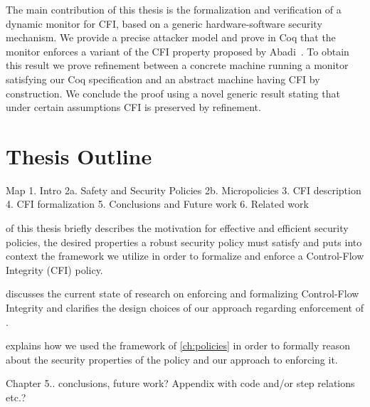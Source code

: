 The main contribution of this thesis is the formalization and
verification of a dynamic monitor for CFI, based on a generic
hardware-software security mechanism.
%
We provide a precise attacker model and prove in Coq that the monitor
enforces a variant of the CFI property proposed by
Abadi~\ETAL\cite{AbadiBEL09}.
%
To obtain this result we prove refinement between a concrete
machine running a monitor satisfying our Coq specification
and an abstract machine having CFI by construction.
%
We conclude the proof using a novel generic result stating that under
certain assumptions CFI is preserved by refinement.

\section{Thesis Outline}\label{sec:outline}
Map
1. Intro
2a. Safety and Security Policies
2b. Micropolicies
3. CFI description
4. CFI formalization
5. Conclusions and Future work
6. Related work

 of this thesis briefly describes the motivation for
effective and efficient security policies, the desired properties a
robust security policy must satisfy and puts into context the
framework we utilize in order to formalize and enforce a Control-Flow
Integrity (CFI) policy.  

 discusses the current state of
research on enforcing and formalizing Control-Flow Integrity and clarifies
the design choices of our approach regarding enforcement of \CFI.

 explains how we used the framework of \cref{ch:policies}
in order to formally reason about the security properties of the \CFI policy and
our approach to enforcing it. 

Chapter 5.. conclusions, future work? Appendix with code and/or step
relations etc.?
